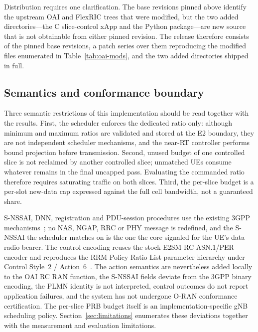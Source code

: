 Distribution requires one clarification. The base revisions pinned above identify the upstream OAI and FlexRIC trees that were modified, but the two added directories---the C slice-control xApp and the \systemname{} Python package---are new source that is not obtainable from either pinned revision. The release therefore consists of the pinned base revisions, a patch series over them reproducing the modified files enumerated in Table~\ref{tab:oai-mods}, and the two added directories shipped in full.

\subsection{Semantics and conformance boundary}
Three semantic restrictions of this implementation should be read together with the results. First, the scheduler enforces the dedicated ratio only: although minimum and maximum ratios are validated and stored at the E2 boundary, they are not independent scheduler mechanisms, and the near-RT controller performs bound projection before transmission. Second, unused budget of one controlled slice is not reclaimed by another controlled slice; unmatched UEs consume whatever remains in the final uncapped pass. Evaluating the commanded ratio therefore requires saturating traffic on both slices. Third, the per-slice budget is a per-slot new-data cap expressed against the full cell bandwidth, not a guaranteed share.

S-NSSAI, DNN, registration and PDU-session procedures use the existing 3GPP mechanisms~\cite{3gpp23501}; no NAS, NGAP, RRC or PHY message is redefined, and the S-NSSAI the scheduler matches on is the one the core signaled for the UE's data radio bearer. The control encoding reuses the stock E2SM-RC ASN.1/PER encoder and reproduces the RRM Policy Ratio List parameter hierarchy under Control Style~2 / Action~6~\cite{oran_e2sm_rc}. The action semantics are nevertheless added locally to the OAI RC RAN function, the S-NSSAI fields deviate from the 3GPP binary encoding, the PLMN identity is not interpreted, control outcomes do not report application failures, and the system has not undergone O-RAN conformance certification. The per-slice PRB budget itself is an implementation-specific gNB scheduling policy. Section~\ref{sec:limitations} enumerates these deviations together with the measurement and evaluation limitations.
